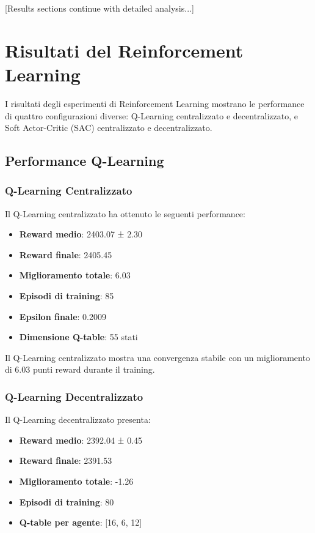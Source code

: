 \documentclass[12pt,a4paper,twoside]{report}
\begin{document}
[Results sections continue with detailed analysis...]


\section{Risultati del Reinforcement Learning}

I risultati degli esperimenti di Reinforcement Learning mostrano le performance di quattro configurazioni diverse: Q-Learning centralizzato e decentralizzato, e Soft Actor-Critic (SAC) centralizzato e decentralizzato.

\subsection{Performance Q-Learning}

\subsubsection{Q-Learning Centralizzato}
Il Q-Learning centralizzato ha ottenuto le seguenti performance:

\begin{itemize}
    \item \textbf{Reward medio}: 2403.07 ± 2.30
    \item \textbf{Reward finale}: 2405.45
    \item \textbf{Miglioramento totale}: 6.03
    \item \textbf{Episodi di training}: 85
    \item \textbf{Epsilon finale}: 0.2009
    \item \textbf{Dimensione Q-table}: 55 stati
\end{itemize}

Il Q-Learning centralizzato mostra una convergenza stabile con un miglioramento di 6.03 punti reward durante il training.

\subsubsection{Q-Learning Decentralizzato}
Il Q-Learning decentralizzato presenta:

\begin{itemize}
    \item \textbf{Reward medio}: 2392.04 ± 0.45
    \item \textbf{Reward finale}: 2391.53
    \item \textbf{Miglioramento totale}: -1.26
    \item \textbf{Episodi di training}: 80
    \item \textbf{Q-table per agente}: [16, 6, 12]
\end{itemize}
\end{document}
